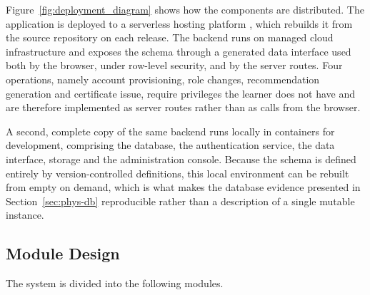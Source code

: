 \documentclass[12pt, oneside]{article} %
\begin{document}
Figure~\ref{fig:deployment_diagram} shows how the components are distributed. The application is deployed to a serverless hosting platform \cite{vercel_docs}, which rebuilds it from the source repository on each release. The backend runs on managed cloud infrastructure and exposes the schema through a generated data interface \cite{postgrest_docs} used both by the browser, under row-level security, and by the server routes. Four operations, namely account provisioning, role changes, recommendation generation and certificate issue, require privileges the learner does not have and are therefore implemented as server routes rather than as calls from the browser.

A second, complete copy of the same backend runs locally in containers for development, comprising the database, the authentication service, the data interface, storage and the administration console. Because the schema is defined entirely by version-controlled definitions, this local environment can be rebuilt from empty on demand, which is what makes the database evidence presented in Section~\ref{sec:phys-db} reproducible rather than a description of a single mutable instance.

\subsection{Module Design}

The system is divided into the following modules.
\end{document}
